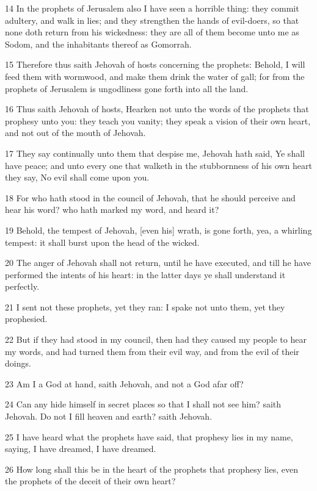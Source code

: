 \par 14 In the prophets of Jerusalem also I have seen a horrible thing: they commit adultery, and walk in lies; and they strengthen the hands of evil-doers, so that none doth return from his wickedness: they are all of them become unto me as Sodom, and the inhabitants thereof as Gomorrah.
\par 15 Therefore thus saith Jehovah of hosts concerning the prophets: Behold, I will feed them with wormwood, and make them drink the water of gall; for from the prophets of Jerusalem is ungodliness gone forth into all the land.
\par 16 Thus saith Jehovah of hosts, Hearken not unto the words of the prophets that prophesy unto you: they teach you vanity; they speak a vision of their own heart, and not out of the mouth of Jehovah.
\par 17 They say continually unto them that despise me, Jehovah hath said, Ye shall have peace; and unto every one that walketh in the stubbornness of his own heart they say, No evil shall come upon you.
\par 18 For who hath stood in the council of Jehovah, that he should perceive and hear his word? who hath marked my word, and heard it?
\par 19 Behold, the tempest of Jehovah, [even his] wrath, is gone forth, yea, a whirling tempest: it shall burst upon the head of the wicked.
\par 20 The anger of Jehovah shall not return, until he have executed, and till he have performed the intents of his heart: in the latter days ye shall understand it perfectly.
\par 21 I sent not these prophets, yet they ran: I spake not unto them, yet they prophesied.
\par 22 But if they had stood in my council, then had they caused my people to hear my words, and had turned them from their evil way, and from the evil of their doings.
\par 23 Am I a God at hand, saith Jehovah, and not a God afar off?
\par 24 Can any hide himself in secret places so that I shall not see him? saith Jehovah. Do not I fill heaven and earth? saith Jehovah.
\par 25 I have heard what the prophets have said, that prophesy lies in my name, saying, I have dreamed, I have dreamed.
\par 26 How long shall this be in the heart of the prophets that prophesy lies, even the prophets of the deceit of their own heart?
